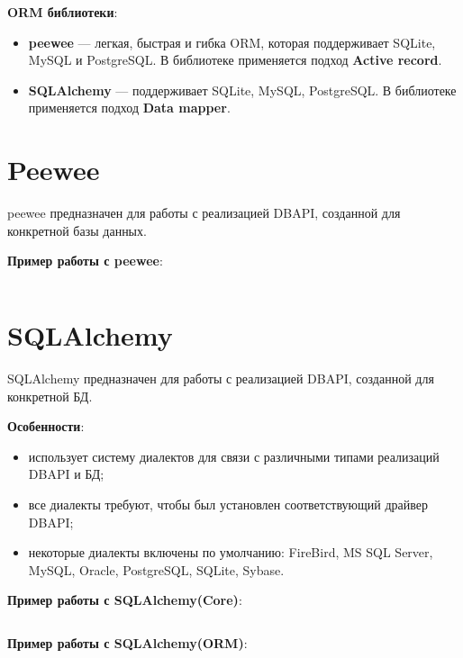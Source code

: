 \documentclass[a4paper,12pt,oneside]{extbook}
\begin{document}
\textbf{ORM библиотеки}:
\begin{itemize}
    \item \textbf{peewee} — легкая, быстрая и гибка ORM, которая поддерживает SQLite, MySQL и PostgreSQL. В библиотеке применяется подход \textbf{Active record}.
    \item \textbf{SQLAlchemy} — поддерживает SQLite, MySQL, PostgreSQL. В библиотеке применяется подход \textbf{Data mapper}.
\end{itemize}

\section{Peewee}%
\label{sec:Peewee}

peewee предназначен для работы с реализацией DBAPI, созданной для конкретной базы данных.

\textbf{Пример работы с peewee}:
\inputminted{python}{./examples/peewee_conn.py}

\section{SQLAlchemy}%
\label{sec:SQLAlchemy}

SQLAlchemy предназначен для работы с реализацией DBAPI, созданной для конкретной БД.

\textbf{Особенности}:
\begin{itemize}
    \item использует систему диалектов для связи с различными типами реализаций DBAPI и БД;
    \item все диалекты требуют, чтобы был установлен соответствующий драйвер DBAPI;
    \item некоторые диалекты включены по умолчанию: FireBird, MS SQL Server, MySQL, Oracle, PostgreSQL, SQLite, Sybase.
\end{itemize}

\textbf{Пример работы с SQLAlchemy(Core)}:
\inputminted{python}{./examples/sqlalchemy_conn.py}

\textbf{Пример работы с SQLAlchemy(ORM)}:
\inputminted{python}{./examples/sqlalchemy_orm.py}
\end{document}
